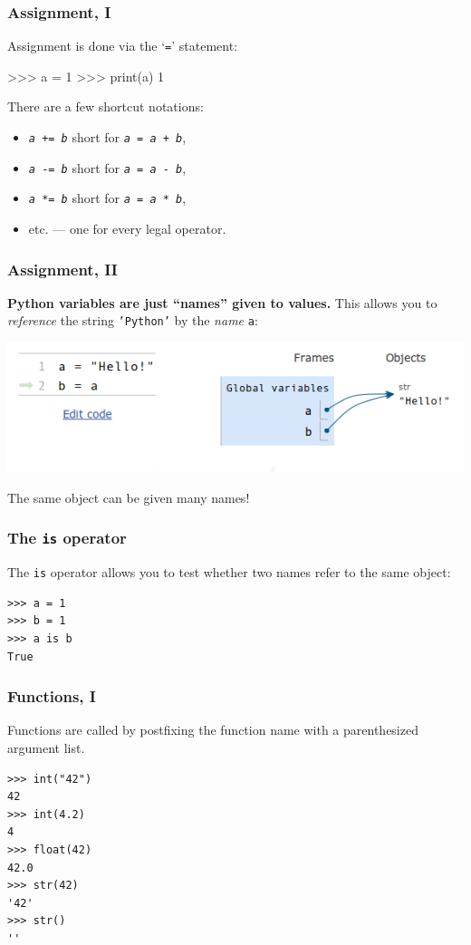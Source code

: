 \documentclass[english,serif,mathserif,xcolor=pdftex,dvipsnames,table]{beamer}
\begin{document}
\begin{frame}[fragile]
  \frametitle{Assignment, I}
  Assignment is done via the `\texttt{=}' statement:
\begin{semiverbatim}
>>> a = 1
>>> print(a)
1
\end{semiverbatim}

  \+
  There are a few shortcut notations:
  \begin{itemize}
  \item[] \texttt{\emph{a} += \emph{b}} short for \texttt{\emph{a} = \emph{a} + \emph{b}},
  \item[] \texttt{\emph{a} -= \emph{b}} short for \texttt{\emph{a} = \emph{a} - \emph{b}},
  \item[] \texttt{\emph{a} *= \emph{b}} short for \texttt{\emph{a} = \emph{a} * \emph{b}},
  \item[]   etc. --- one for every legal operator.
  \end{itemize}
\end{frame}


\begin{frame}[fragile]
  \frametitle{Assignment, II}

  \textbf{Python variables are just ``names'' given to values.}
  This allows you to \emph{reference} the string \texttt{'Python'}
  by the \emph{name} \texttt{a}:

  \+
  \includegraphics[width=1\linewidth]{fig/a=b.png}

  \+
  The same object can be given many names!
\end{frame}


\begin{frame}[fragile]
  \frametitle{The \texttt{is} operator}

  The \texttt{is} operator allows you to test whether two names refer
  to the same object:
\begin{lstlisting}
>>> a = 1
>>> b = 1
>>> a is b
True
\end{lstlisting}

\end{frame}


\begin{frame}[fragile,label=func1]
  \frametitle{Functions, I}
  Functions are called by postfixing the function name with a
  parenthesized argument list.

  \+
\begin{lstlisting}
>>> int("42")
42
>>> int(4.2)
4
>>> float(42)
42.0
>>> str(42)
'42'
>>> str()
''
\end{lstlisting}

  \hyperlink{typeconv}{}
\end{frame}
\end{document}
